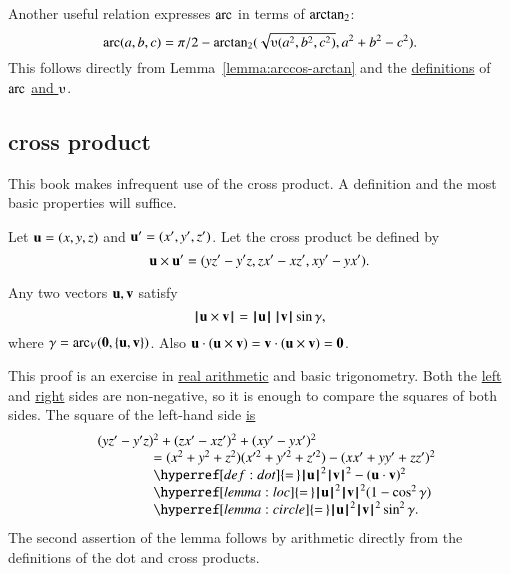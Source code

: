 Another useful relation expresses $\operatorname{arc}$ in terms of ${\operatorname{arctan_2}}$:
\begin{displaymath}
\arc(a,b,c) = 
\pi/2 - \atn({\sqrt{\ups(a^2,b^2,c^2)}},{ a^2 + b^2 - c^2}).
\end{displaymath}
This follows directly from Lemma~\ref{lemma:arccos-arctan} and the
\hyperref[def:arc]{definitions} of $\operatorname{arc}$ \hyperref[def:ups]{and
  $\ups$}.



\subsection{cross product} 

This book makes infrequent use of the cross product.
A definition and the most basic properties will suffice.

\begin{definition}\label{def:cross}   
Let ${\mathbf u} =(x,y,z)$ and ${\mathbf u}' = (x',y',z')$.  
Let the cross product be defined
by
\begin{displaymath}
{\mathbf u} \times {\mathbf u}' = (y z' - y' z, z x' - x z', x y' - y x').
\end{displaymath}
%
%
%
\end{definition}

\begin{lemma}[]  
Any two vectors ${\mathbf u},{\mathbf v}$ satisfy
\begin{displaymath}{{\hskip0.1em|\hskip-0.15em|\hskip0.1em}{\mathbf u}\times {\mathbf v}{\hskip0.1em|\hskip-0.15em|\hskip0.1em}} =
  {{\hskip0.1em|\hskip-0.15em|\hskip0.1em}{\mathbf u}{\hskip0.1em|\hskip-0.15em|\hskip0.1em}}\,{{\hskip0.1em|\hskip-0.15em|\hskip0.1em}{\mathbf v}{\hskip0.1em|\hskip-0.15em|\hskip0.1em}}\sin\gamma,\end{displaymath}
where $\gamma=\operatorname{arc}_V({\mathbf 0},\{{\mathbf u},{\mathbf v}\})$.
Also ${\mathbf u} \cdot ({\mathbf u}\times {\mathbf v}) = {\mathbf v}\cdot ({\mathbf u}\times {\mathbf v}) = {\mathbf 0}$.
\end{lemma}

\begin{proved} This proof is an exercise in
  \hyperref[back:analysis]{real arithmetic} and basic trigonometry.
  Both the \hyperref[eqn:dot]{left} and
  \hyperref[lemma:sin-pos]{right} sides are non-negative, so it is
  enough to compare the squares of both sides.  The square of the
  left-hand side \hyperref[def:cross]{is}
\begin{displaymath}
\begin{array}{lll}
  &(y z'- y'z)^2 + (z x' - x z')^2 + (x y' - y x')^2 \\
  &\qquad\qquad=
  (x^2 + y^2 + z^2)(x'^2 + y'^2 + z'^2) - (x x' + y y' + z z')^2
  \\&\qquad\qquad \hyperref[def:dot]{=\,} 
  \normo{\u}^2\normo{\v}^2 - (\u\cdot \v)^2 \\
  &\qquad\qquad\hyperref[lemma:loc]{=\,} 
  \normo{\u}^2\normo{\v}^2 ( 1 - \cos^2\gamma)\\
  &\qquad\qquad\hyperref[lemma:circle]{=\,} 
\normo{\u}^2\normo{\v}^2 \sin^2\gamma.
\end{array}
\end{displaymath}
The second assertion of the lemma follows by arithmetic directly from
the definitions of the dot and cross products.  \swallowed\end{proved}


